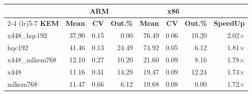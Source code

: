 \begin{table}[!ht]
\begin{tabular}{lrrr|rrr|r}
 \toprule
& \multicolumn{3}{c}{\bfseries ARM} & \multicolumn{3}{c}{\bfseries x86} &\\
\cmidrule(lr){2-4} \cmidrule(lr){5-7}
\textbf{KEM} & \textbf{Mean} & \textbf{CV} & \textbf{Out.\%} & \textbf{Mean} & \textbf{CV} & \textbf{Out.\%} & \textbf{SpeedUp}\\
\midrule
x448_hqc192 & 37.90 & 0.15 & 0.00 & 76.49 & 0.06 & 10.20 & 2.02× \\
hqc192 & 41.46 & 0.13 & 24.49 & 74.92 & 0.05 & 6.12 & 1.81× \\
x448_mlkem768 & 12.10 & 0.27 & 10.20 & 21.60 & 0.09 & 8.16 & 1.78× \\
x448 & 11.16 & 0.31 & 14.29 & 19.47 & 0.09 & 12.24 & 1.74× \\
mlkem768 & 11.47 & 0.66 & 6.12 & 19.68 & 0.08 & 0.00 & 1.72× \\
\bottomrule
\end{tabular}
\end{table}
